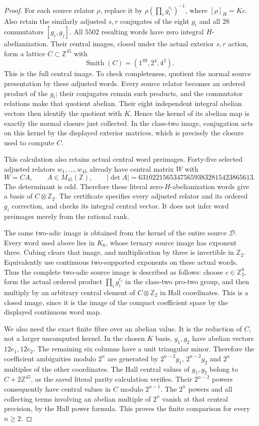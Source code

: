 \begin{proof}
For each source relator $\rho$, replace it by
$\rho(\prod_i g_i^{c_i})^{-1}$, where
$[\rho]_H=Kc$.  Also retain the similarly adjusted
$s,r$ conjugates of the eight $g_i$ and all
$28$ commutators $[g_i,g_j]$.
All $5502$ resulting words have zero integral
$H$-abelianization.
Their central images, closed under the actual
exterior $s,r$ action, form a lattice
$C\subset\mathbb Z^{45}$ with
\[
             \operatorname{Smith}(C)=(1^{39},2^4,4^2).
 \tag{E.41.6}
\]
This is the full central image.
To check completeness, quotient the normal
source presentation by these adjusted words.
Every source relator becomes an ordered product
of the $g_i$; their conjugates remain such products,
and the commutator relations make that quotient
abelian.  Their eight independent integral
abelian vectors then identify the quotient with
$K$.  Hence the kernel of its abelian map is
exactly the normal closure just collected.
In the class-two image, conjugation acts on
this kernel by the displayed exterior matrices,
which is precisely the closure used to compute
$C$.

This calculation also retains actual central
word preimages.  Forty-five selected adjusted
relators $w_1,\ldots,w_{45}$ already have central
matrix $W$ with
\[
 W=C A,\qquad
 A\in M_{45}(\mathbb Z),\qquad
 |\det A|=631022156534756593832815423865613.
 \tag{E.41.7}
\]
The determinant is odd.  Therefore these literal
zero-$H$-abelianization words give a basis of
$C\otimes\mathbb Z_2$.
The certificate specifies every adjusted
relator and its ordered $g_i$ correction,
and checks its integral central vector.
It does not infer word preimages merely from
the rational rank.

The same two-adic image is obtained from the
kernel of the entire source $\mathscr D$.
Every word used above lies in $K_6$, whose
ternary source image has exponent three.
Cubing clears that image, and multiplication
by three is invertible in $\mathbb Z_2$.
Equivalently use continuous two-supported
exponents on these actual words.
Thus the complete two-adic source image is
described as follows: choose $c\in\mathbb Z_2^8$,
form the actual ordered product $\prod_i g_i^{c_i}$
in the class-two pro-two group, and then multiply
by an arbitrary central element of
$C\otimes\mathbb Z_2$ in Hall coordinates.
This is a closed image, since it is the image
of the compact coefficient space by the
displayed continuous word map.

We also need the exact finite fibre over an
abelian value.  It is the reduction of $C$,
not a larger uncomputed kernel.
In the chosen $K$ basis, $g_1,g_2$ have
abelian vectors $12e_1,12e_2$.
The remaining six columns have a unit triangular
minor.  Therefore the coefficient ambiguities
modulo $2^n$ are generated by $2^{n-2}g_1$,
$2^{n-2}g_2$ and $2^n$ multiples of the other
coordinates.  The Hall central values of
$g_1,g_2$ belong to $C+2\mathbb Z^{45}$,
as the saved literal parity calculation verifies.
Their $2^{n-2}$ powers consequently have
central values in $C$ modulo $2^{n-1}$.
The $2^n$ powers and all collecting terms involving
an abelian multiple of $2^n$ vanish at that
central precision, by the Hall power formula.
This proves the finite comparison for every
$n\ge2$.


\end{proof}
